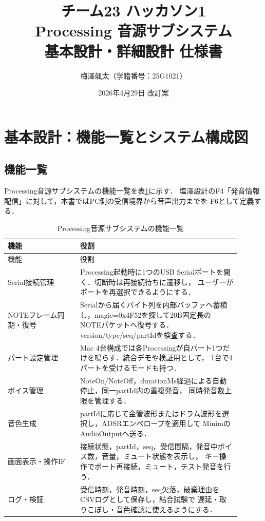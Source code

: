 \documentclass[a4paper,11pt]{jsarticle}
\title{チーム23 ハッカソン1\\
Processing 音源サブシステム\\
基本設計・詳細設計 仕様書}
\author{梅澤颯太（学籍番号：25G1021）}
\date{2026年4月29日 改訂案}
\begin{document}
\maketitle
\tableofcontents
\newpage

\section{基本設計：機能一覧とシステム構成図}

\subsection{機能一覧}

Processing音源サブシステムの機能一覧を表\ref{tab:fbs}に示す．
塩澤設計のF4「発音情報配信」に対して，本書ではPC側の受信境界から音声出力までを
F6として定義する．

\begin{longtable}{p{0.28\linewidth}p{0.62\linewidth}}
\caption{Processing音源サブシステムの機能一覧}\label{tab:fbs}\\
\hline
機能 & 役割 \\
\hline
\endfirsthead
\hline
機能 & 役割 \\
\hline
\endhead
Serial接続管理 &
Processing起動時に1つのUSB Serialポートを開く．切断時は再接続待ちに遷移し，
ユーザーがポートを再選択できるようにする． \\
\hline
NOTEフレーム同期・復号 &
Serialから届くバイト列を内部バッファへ蓄積し，magic=0x4F52を探して20B固定長の
NOTEパケットへ復号する．version/type/seq/partIdを検査する． \\
\hline
パート設定管理 &
Mac 4台構成では各Processingが自パート1つだけを鳴らす．統合デモや検証用として，
1台で4パートを受けるモードも持つ． \\
\hline
ボイス管理 &
NoteOn/NoteOff，durationMs経過による自動停止，同一partId内の重複発音，
同時発音数上限を管理する． \\
\hline
音色生成 &
partIdに応じて金管波形またはドラム波形を選択し，ADSRエンベロープを適用して
MinimのAudioOutputへ送る． \\
\hline
画面表示・操作IF &
接続状態，partId，seq，受信間隔，発音中ボイス数，音量，ミュート状態を表示し，
キー操作でポート再接続，ミュート，テスト発音を行う． \\
\hline
ログ・検証 &
受信時刻，発音時刻，seq欠落，破棄理由をCSVログとして保存し，結合試験で
遅延・取りこぼし・音色確認に使えるようにする． \\
\hline
\end{longtable}
\end{document}
